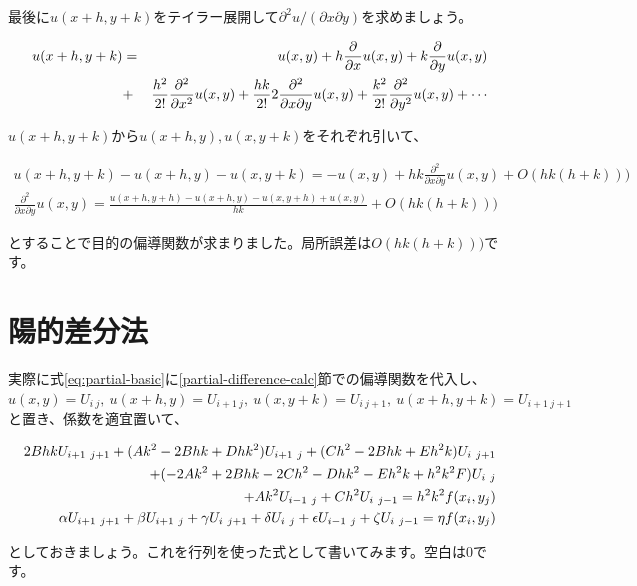 最後に$u(x+h,y+k)$をテイラー展開して$\partial^2 u/(\partial x \partial y)$を求めましょう。

\begin{eqnarray}
    u(x+h,y+k)&=&u(x,y)+h\frac{\partial}{\partial x}u(x,y)+k\frac{\partial}{\partial y}u(x,y) \nonumber \\
    &+&\frac{h^2}{2!}\frac{\partial^2}{\partial x^2}u(x,y)+\frac{hk}{2!}2\frac{\partial^2}{\partial x\partial y}u(x,y)+\frac{k^2}{2!}\frac{\partial^2}{\partial y^2}u(x,y)+\cdots \setcounter{equation}{10}
\end{eqnarray}

\noindent
$u(x+h,y+k)$から$u(x+h,y),u(x,y+k)$をそれぞれ引いて、

\begin{eqnarray}
    u(x+h,y+k)-u(x+h,y)-u(x,y+k)=-u(x,y)+hk\frac{\partial^2}{\partial x\partial y}u(x,y)+O(hk(h+k))) \\
    \frac{\partial^2}{\partial x\partial y}u(x,y)=\frac{u(x+h,y+h)-u(x+h,y)-u(x,y+h)+u(x,y)}{hk}+O(hk(h+k)))
\end{eqnarray}

\noindent
とすることで目的の偏導関数が求まりました。局所誤差は$O(hk(h+k)))$です。








\section{陽的差分法}
\label{partial-difference-explicit}
実際に式\ref{eq:partial-basic}に\ref{partial-difference-calc}節での偏導関数を代入し、$u(x,y)=U_{i\ j},\ u(x+h,y)=U_{i+1\ j},\ u(x,y+k)=U_{i\ j+1},\ u(x+h,y+k)=U_{i+1\ j+1}$と置き、係数を適宜置いて、

\begin{eqnarray}
    \label{eq:partial-difference-former}
    2BhkU_{i+1\ j+1}+(Ak^2-2Bhk+Dhk^2)U_{i+1\ j}+(Ch^2-2Bhk+Eh^2k)U_{i\ j+1} \nonumber \\
    +(-2Ak^2+2Bhk-2Ch^2-Dhk^2-Eh^2k+h^2k^2F)U_{i\ j} \nonumber \\
    +Ak^2U_{i-1\ j}+Ch^2U_{i\ j-1}=h^2k^2f(x_i,y_j) \setcounter{equation}{13} \\
    \alpha U_{i+1\ j+1}+\beta U_{i+1\ j}+\gamma U_{i\ j+1}+\delta U_{i\ j}+\epsilon U_{i-1\ j}+\zeta U_{i\ j-1}=\eta f(x_i,y_j)
    \label{eq:partial-difference}
\end{eqnarray}

\noindent
としておきましょう。これを行列を使った式として書いてみます。空白は0です。

